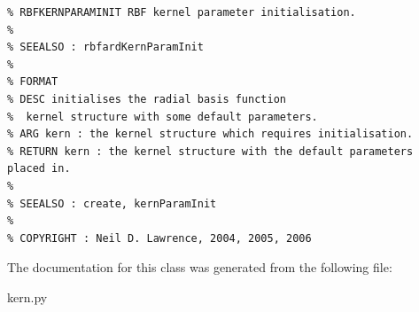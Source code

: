 \footnotesize\begin{verbatim}% RBFKERNPARAMINIT RBF kernel parameter initialisation.
%
% SEEALSO : rbfardKernParamInit
%
% FORMAT
% DESC initialises the radial basis function
%  kernel structure with some default parameters.
% ARG kern : the kernel structure which requires initialisation.
% RETURN kern : the kernel structure with the default parameters placed in.
%
% SEEALSO : create, kernParamInit
%
% COPYRIGHT : Neil D. Lawrence, 2004, 2005, 2006

\end{verbatim}
\normalsize
 

The documentation for this class was generated from the following file:\begin{CompactItemize}
\item 
kern.py\end{CompactItemize}
